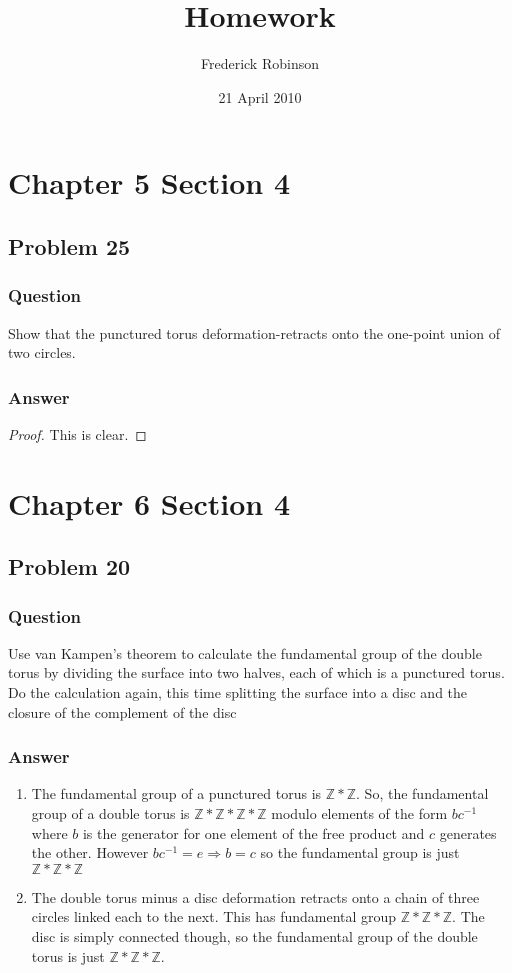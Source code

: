 \documentclass[10pt]{article}
\title{Homework}
\author{Frederick Robinson}
\date{21 April 2010}
\begin{document}

   \maketitle

\section{Chapter 5 Section 4}

\subsection{Problem 25}
\subsubsection{Question}
Show that the punctured torus deformation-retracts onto the one-point union of two circles.
\subsubsection{Answer}
\begin{proof}This is clear.\end{proof}
\section{Chapter 6 Section 4}

\subsection{Problem 20}
\subsubsection{Question}
Use van Kampen's theorem to calculate the fundamental group of the double torus by dividing the surface into two halves, each of which is a punctured torus. Do the calculation again, this time splitting the surface into a disc and the closure of the complement of the disc
\subsubsection{Answer}
\begin{enumerate}
\item The fundamental group of a punctured torus is $\mathbb{Z} * \mathbb{Z}$. So, the fundamental group of a double torus is $\mathbb{Z} * \mathbb{Z}*\mathbb{Z} * \mathbb{Z}$ modulo elements of the form $b c^{-1}$ where $b$ is the generator for one element of the free product and $c$ generates the other. However $b c^{-1}= e \Rightarrow b=c $ so the fundamental group is just $\mathbb{Z} * \mathbb{Z}* \mathbb{Z}$
\item The double torus minus a disc deformation retracts onto a chain of three circles linked each to the next. This has fundamental group $\mathbb{Z} * \mathbb{Z}* \mathbb{Z}$. The disc is simply connected though, so the fundamental group of the double torus is just $\mathbb{Z} * \mathbb{Z} * \mathbb{Z}$.
\end{enumerate}
\end{document}
